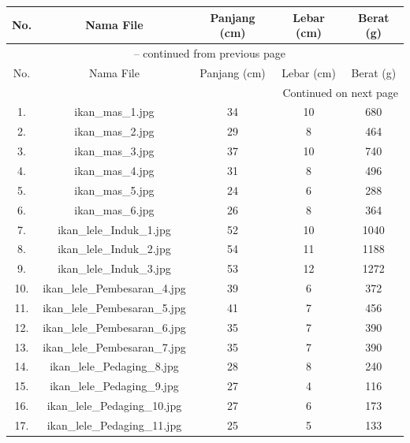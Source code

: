 \begin{longtable}{|c|c|c|c|c|}
        \hline
        No. & Nama File & Panjang (cm) & Lebar (cm) & Berat (g) \\
        \hline
        \endfirsthead
        \multicolumn{5}{c}{{\tablename\ \thetable{} -- continued from previous page}} \\
        \hline
        No. & Nama File & Panjang (cm) & Lebar (cm) & Berat (g) \\
        \hline
        \endhead
        \hline \multicolumn{5}{|r|}{{Continued on next page}} \\ \hline
        \endfoot
        \hline
        \endlastfoot

        1. & ikan\_mas\_1.jpg & 34 & 10 & 680 \\
        \hline
        2. & ikan\_mas\_2.jpg & 29 & 8 & 464 \\
        \hline
        3. & ikan\_mas\_3.jpg & 37 & 10 & 740 \\
        \hline
        4. & ikan\_mas\_4.jpg & 31 &  8 & 496 \\
        \hline
        5. & ikan\_mas\_5.jpg & 24 & 6 & 288 \\
        \hline
        6. & ikan\_mas\_6.jpg & 26 & 8 & 364 \\
        \hline
        7. & ikan\_lele\_Induk\_1.jpg & 52 & 10 & 1040 \\
        \hline
        8. & ikan\_lele\_Induk\_2.jpg & 54 & 11 & 1188 \\
        \hline
        9. & ikan\_lele\_Induk\_3.jpg & 53 & 12 & 1272 \\
        \hline
        10. & ikan\_lele\_Pembesaran\_4.jpg & 39 & 6 & 372 \\
        \hline
        11. & ikan\_lele\_Pembesaran\_5.jpg & 41 & 7 & 456 \\
        \hline
        12. & ikan\_lele\_Pembesaran\_6.jpg & 35 & 7 & 390 \\
        \hline
        13. & ikan\_lele\_Pembesaran\_7.jpg & 35 & 7 & 390 \\
        \hline
        14. & ikan\_lele\_Pedaging\_8.jpg & 28 & 8 & 240 \\
        \hline
        15. & ikan\_lele\_Pedaging\_9.jpg & 27 & 4 & 116 \\
        \hline
        16. & ikan\_lele\_Pedaging\_10.jpg & 27 & 6 & 173 \\
        \hline
        17. & ikan\_lele\_Pedaging\_11.jpg & 25 & 5 & 133 \\
        \hline

\end{longtable}
